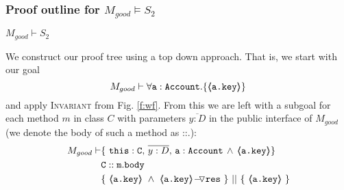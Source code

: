  \subsubsection{Proof outline for $M_{good} \models S_2$}

\newcommand{\SPTG}{~ \strut \hspace{.6cm}}

\begin{lemma}
\label{lemma:exampleKeyProtect}
$M_{good} \vdash S_2$
\end{lemma}
\begin{proofO}
We construct our proof tree using a top down approach.  That is, we start with our goal
$$M_{good} \vdash \forall {\mbox{\normalfont{\texttt{a}}}:\mbox{\normalfont{\texttt{Account}}}}.{{\{}}{\langle\!\!\langle \mbox{\normalfont{\texttt{\mbox{\normalfont{\texttt{a.key}}}}}} \rangle\!\!\rangle}{{\}}}$$
and apply  \textsc{Invariant} from Fig. \ref{f:wf}.
From this we are left with a subgoal for each method $m$ in  class $C$ with parameters $\overline{y:D}$ in the public interface of $M_{good}$ (we denote the body of such a method as ::.):
\small
\begin{align*}
M_{good} \vdash
		& \{ \ \prg{this}:\prg{C},\, \overline{y:D},\, \prg{a}:\prg{Account}\, \wedge\,
		   {\inside{\prg{a.key}}}\} \\
		& \prg{C}::\prg{m}.\prg{body}\ \\
		& \{\ {\inside{\prg{a.key}}}\ \wedge\ {\PushASLong {\prg{res}} {\inside{\prg{a.key}}}}\ \}\ ||\ \{\ {\inside{\prg{a.key}}} \ 			\} 
\end{align*}
\normalsize
{}


\end{proofO}
